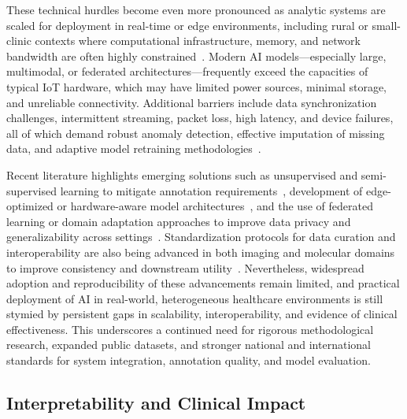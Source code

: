 \documentclass[sigconf]{acmart}
\begin{document}
These technical hurdles become even more pronounced as analytic systems are scaled for deployment in real-time or edge environments, including rural or small-clinic contexts where computational infrastructure, memory, and network bandwidth are often highly constrained~\cite{ref16,ref37,ref46,ref54,ref57,ref61,ref70,ref71,ref72,ref73,ref74,ref75,ref76,ref78,ref83,ref90,ref106}. Modern AI models—especially large, multimodal, or federated architectures—frequently exceed the capacities of typical IoT hardware, which may have limited power sources, minimal storage, and unreliable connectivity. Additional barriers include data synchronization challenges, intermittent streaming, packet loss, high latency, and device failures, all of which demand robust anomaly detection, effective imputation of missing data, and adaptive model retraining methodologies~\cite{ref51,ref54,ref56,ref61,ref78,ref102}.

Recent literature highlights emerging solutions such as unsupervised and semi-supervised learning to mitigate annotation requirements~\cite{ref54,ref57,ref33,ref105}, development of edge-optimized or hardware-aware model architectures~\cite{ref54,ref78,ref102,ref103}, and the use of federated learning or domain adaptation approaches to improve data privacy and generalizability across settings~\cite{ref51,ref31,ref105}. Standardization protocols for data curation and interoperability are also being advanced in both imaging and molecular domains to improve consistency and downstream utility~\cite{ref45,ref60,ref84,ref82,ref83}. Nevertheless, widespread adoption and reproducibility of these advancements remain limited, and practical deployment of AI in real-world, heterogeneous healthcare environments is still stymied by persistent gaps in scalability, interoperability, and evidence of clinical effectiveness. This underscores a continued need for rigorous methodological research, expanded public datasets, and stronger national and international standards for system integration, annotation quality, and model evaluation.

\subsection{Interpretability and Clinical Impact}
\end{document}

